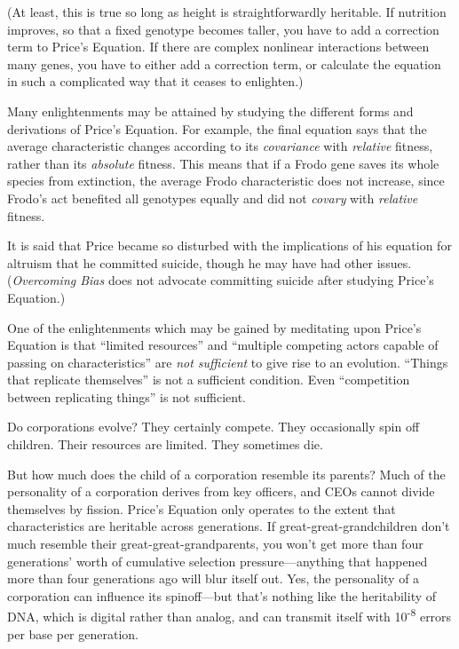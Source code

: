 {
 (At least, this is true so long as height is straightforwardly
heritable. If nutrition improves, so that a fixed genotype becomes
taller, you have to add a correction term to Price's
Equation. If there are complex nonlinear interactions between many
genes, you have to either add a correction term, or calculate the
equation in such a complicated way that it ceases to enlighten.)}

{
 Many enlightenments may be attained by studying the different
forms and derivations of Price's Equation. For example,
the final equation says that the average characteristic changes
according to its \textit{covariance} with \textit{relative} fitness,
rather than its \textit{absolute} fitness. This means that if a Frodo
gene saves its whole species from extinction, the average Frodo
characteristic does not increase, since Frodo's act
benefited all genotypes equally and did not \textit{covary} with
\textit{relative} fitness.}

{
 It is said that Price became so disturbed with the implications of
his equation for altruism that he committed suicide, though he may have
had other issues. (\textit{Overcoming Bias} does not advocate
committing suicide after studying Price's Equation.)}

{
 One of the enlightenments which may be gained by meditating upon
Price's Equation is that ``limited
resources'' and ``multiple competing
actors capable of passing on characteristics'' are
\textit{not sufficient} to give rise to an evolution.
``Things that replicate themselves''
is not a sufficient condition. Even ``competition
between replicating things'' is not sufficient.}

{
 Do corporations evolve? They certainly compete. They occasionally
spin off children. Their resources are limited. They sometimes die.}

{
 But how much does the child of a corporation resemble its parents?
Much of the personality of a corporation derives from key officers, and
CEOs cannot divide themselves by fission. Price's
Equation only operates to the extent that characteristics are heritable
across generations. If great-great-grandchildren don't
much resemble their great-great-grandparents, you won't
get more than four generations' worth of cumulative
selection pressure---anything that happened more than four generations
ago will blur itself out. Yes, the personality of a corporation can
influence its spinoff---but that's nothing like the
heritability of DNA, which is digital rather than analog, and can
transmit itself with 10\textsuperscript{{}-8} errors per base per
generation.}

